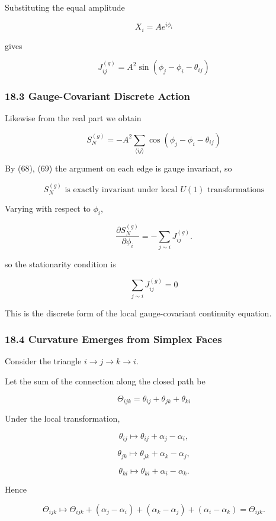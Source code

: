 \documentclass[
  a4paper,
]{article}
\begin{document}
Substituting the equal amplitude

\[
X_i=Ae^{i\phi_i}
\]

gives

\[
\boxed{
J_{ij}^{(g)}
=
A^2
\sin
\left(
\phi_j-\phi_i-\theta_{ij}
\right)
}
\tag{73}
\]

\subsubsection{18.3 Gauge-Covariant Discrete
Action}\label{gauge-covariant-discrete-action}

Likewise from the real part we obtain

\[
\boxed{
S_N^{(g)}
=
-A^2
\sum_{\langle ij\rangle}
\cos
\left(
\phi_j-\phi_i-\theta_{ij}
\right)
}
\tag{74}
\]

By (68), (69) the argument on each edge is gauge invariant, so

\[
\boxed{
S_N^{(g)}
\text{ is exactly invariant under local }U(1)\text{ transformations}
}
\tag{75}
\]

Varying with respect to \(\phi_i\),

\[
\frac{\partial S_N^{(g)}}{\partial\phi_i}
=
-\sum_{j\sim i}
J_{ij}^{(g)}.
\]

so the stationarity condition is

\[
\boxed{
\sum_{j\sim i}
J_{ij}^{(g)}
=
0
}
\tag{76}
\]

This is the discrete form of the local gauge-covariant continuity
equation.

\subsubsection{18.4 Curvature Emerges from Simplex
Faces}\label{curvature-emerges-from-simplex-faces}

Consider the triangle \(i\to j\to k\to i\).

Let the sum of the connection along the closed path be

\[
\boxed{
\Theta_{ijk}
=
\theta_{ij}
+
\theta_{jk}
+
\theta_{ki}
}
\tag{77}
\]

Under the local transformation,

\[
\theta_{ij}
\mapsto
\theta_{ij}+\alpha_j-\alpha_i,
\]

\[
\theta_{jk}
\mapsto
\theta_{jk}+\alpha_k-\alpha_j,
\]

\[
\theta_{ki}
\mapsto
\theta_{ki}+\alpha_i-\alpha_k.
\]

Hence

\[
\Theta_{ijk}
\mapsto
\Theta_{ijk}
+
(\alpha_j-\alpha_i)
+
(\alpha_k-\alpha_j)
+
(\alpha_i-\alpha_k)
=
\Theta_{ijk}.
\]
\end{document}
